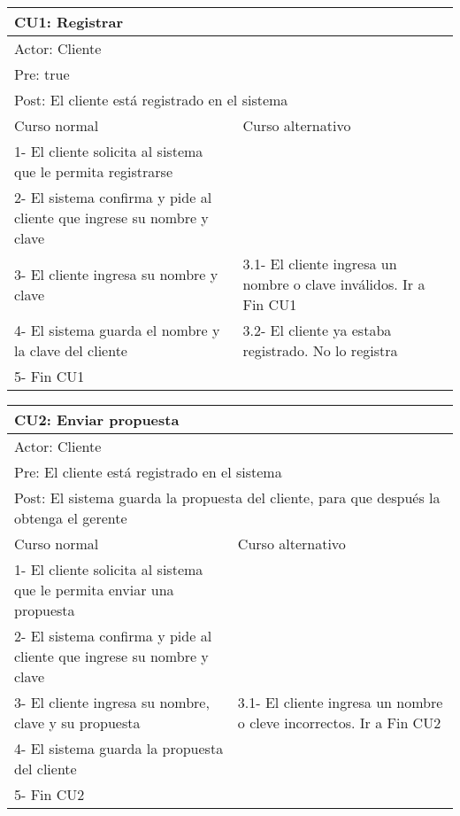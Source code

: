 \begin{table}[H]
  \begin{adjustbox}{max width = \textwidth}
  \begin{tabular}{|l|l|}
  \hline
  \multicolumn{2}{|l|}{CU1: Registrar} \\\hline
  \multicolumn{2}{|l|}{Actor: Cliente} \\\hline
  \multicolumn{2}{|l|}{Pre: true} \\\hline
  \multicolumn{2}{|l|}{Post: El cliente está registrado en el sistema} \\\hline
   Curso normal & Curso alternativo\\ \hline
   1- El cliente solicita al sistema que le permita registrarse & \\ \hline
   2- El sistema confirma y pide al cliente que ingrese su nombre y clave & \\ \hline
   3- El cliente ingresa su nombre y clave & 3.1- El cliente ingresa un nombre o clave inválidos. Ir a Fin CU1\\ \hline
   4- El sistema guarda el nombre y la clave del cliente & 3.2- El cliente ya estaba registrado. No lo registra\\ \hline
   5- Fin CU1 & \\ \hline
  \end{tabular}
  \end{adjustbox}
\end{table}

\begin{table}[H]
  \begin{adjustbox}{max width = \textwidth}
  \begin{tabular}{|l|l|}
    \hline
    \multicolumn{2}{|l|}{CU2: Enviar propuesta} \\\hline
    \multicolumn{2}{|l|}{Actor: Cliente} \\\hline
    \multicolumn{2}{|l|}{Pre: El cliente está registrado en el sistema} \\\hline
    \multicolumn{2}{|l|}{Post: El sistema guarda la propuesta del cliente, para que después la obtenga el gerente} \\\hline
     Curso normal & Curso alternativo\\ \hline
     1- El cliente solicita al sistema que le permita enviar una propuesta & \\ \hline
     2- El sistema confirma y pide al cliente que ingrese su nombre y clave & \\ \hline
     3- El cliente ingresa su nombre, clave y su propuesta  & 3.1- El cliente ingresa un nombre o cleve incorrectos. Ir a Fin CU2\\ \hline
     4- El sistema guarda la propuesta del cliente & \\ \hline
     5- Fin CU2 & \\ \hline
  \end{tabular}
  \end{adjustbox}
\end{table}

